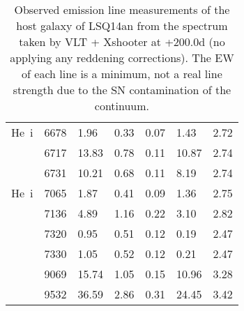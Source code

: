 \documentclass[useAMS,usenatbib]{mn2e}
\def\sii{[S~{\sc ii}]}
\def\siii{[S~{\sc iii}]}
\def\ariii{[Ar~{\sc iii}]}
\def\oii{[O~{\sc ii}]}
\begin{document}
\begin{table*}
\begin{center}
\begin{tabular}[t]{lllllll}
He~{\sc i}&6678&1.96&0.33&0.07&1.43&2.72\\
\sii&6717&13.83&0.78&0.11&10.87&2.74\\
\sii&6731&10.21&0.68&0.11&8.19&2.74\\
He~{\sc i}&7065&1.87&0.41&0.09&1.36&2.75\\
\ariii&7136&4.89&1.16&0.22&3.10&2.82\\
\oii&7320&0.95&0.51&0.12&0.19&2.47\\
\oii&7330&1.05&0.52&0.12&0.21&2.47\\
\siii&9069&15.74&1.05&0.15&10.96&3.28\\
\siii&9532&36.59&2.86&0.31&24.45&3.42\\
\hline
\end{tabular}
\caption{Observed emission line measurements of the host galaxy of LSQ14an from the spectrum taken by VLT + Xshooter at +200.0d (no applying any reddening corrections). The EW of each line is a minimum, not a real line strength due to the SN contamination of the continuum.} 
\label{tab:other_14an_flux_vlt}
\end{center}
\end{table*}
\end{document}
